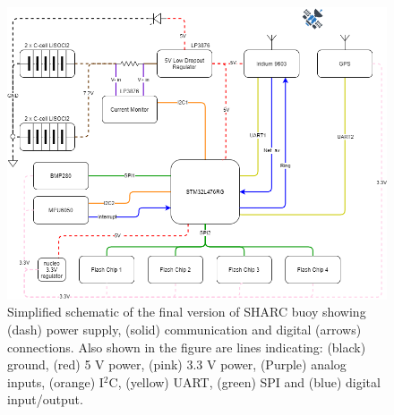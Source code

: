 \begin{landscape}
	\centering
	\vspace*{\fill}
	\begin{figure}[htpb]
		\centering
		\captionsetup{font=footnotesize}
		\includegraphics[height=0.6\textwidth,width=1.2\textheight]{figs/SHARC_Final.png}
		\caption{Simplified schematic of the final version of SHARC buoy showing (dash) power supply, (solid) communication and digital (arrows) connections. Also shown in the figure are lines indicating: (black) ground, (red) 5 V power, (pink) 3.3 V power, (Purple) analog inputs, (orange) I$^2$C, (yellow) UART, (green) SPI and (blue) digital input/output.}
		\label{fig:sharc_final}
	\end{figure}
	\vfill
\end{landscape}


